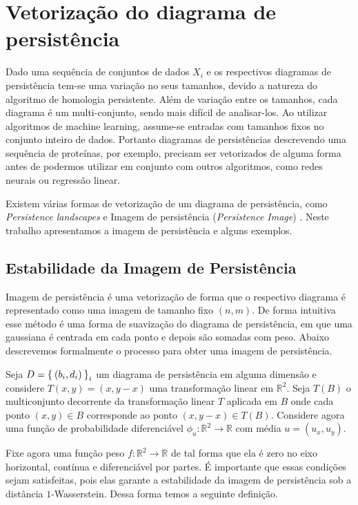 \section{Vetorização do diagrama de persistência}
Dado uma sequência de conjuntos de dados $X_i$ e os respectivos diagramas de persistência tem-se uma variação no
seus tamanhos, devido a natureza do algoritmo de homologia persistente. Além de variação entre os tamanhos, cada 
diagrama é um multi-conjunto, sendo mais difícil de analisar-los. Ao utilizar algoritmos de machine learning, 
assume-se entradas com tamanhos fixos no conjunto inteiro de dados. Portanto diagramas de persistências descrevendo
uma sequência de proteínas, por exemplo, precisam ser vetorizados de alguma forma antes de podermos utilizar em
conjunto com outros algoritmos, como redes neurais ou regressão linear. 

Existem várias formas de vetorização de um diagrama de persistência, como \textit{Persistence landscapes}
\cite{bubenik15a} e Imagem de persistência (\textit{Persistence Image}) \cite{Adams2017}. Neste trabalho apresentamos
a imagem de persistência e alguns exemplos.

\subsection{Estabilidade da Imagem de Persistência}
Imagem de persistência é uma vetorização de forma que o respectivo diagrama é representado como 
uma imagem de tamanho fixo $(n,m)$. De forma intuitiva esse método é uma forma de suavização do diagrama 
de persistência, em que uma gaussiana é centrada em cada ponto e depois são somadas com peso. Abaixo descrevemos
formalmente o processo para obter uma imagem de persistência.

Seja $D = \Set{(b_i,d_i)}_{i}$ um diagrama de persistência em alguma dimensão e considere $T(x,y) = (x, y-x)$ 
uma transformação linear em $\mathbb{R}^2$. Seja $T(B)$ o multiconjunto decorrente da transformação linear $T$
aplicada em $B$ onde cada ponto $(x,y) \in B$ corresponde ao ponto $(x,y-x) \in T(B)$. Considere agora uma 
função de probabilidade diferenciável $\phi_u\colon \mathbb{R}^2 \to \mathbb{R}$ com média $u=(u_x, u_y)$. 

Fixe agora uma função peso $f\colon \mathbb{R}^2 \to \mathbb{R}$ de tal forma que ela é zero no eixo horizontal,
contínua e diferenciável por partes. É importante que essas condições sejam satisfeitas, pois elas garante
a estabilidade da imagem de persistência sob a distância $1$-Wasserstein. Dessa forma temos a seguinte definição. 

